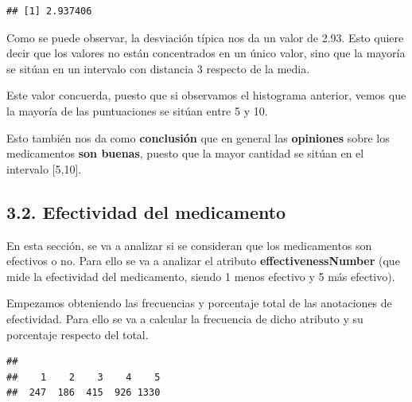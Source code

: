 \documentclass[spanish,]{article}
\newenvironment{Shaded}{\begin{snugshade}}{\end{snugshade}}
\newcommand{\KeywordTok}[1]{\textcolor[rgb]{0.13,0.29,0.53}{\textbf{#1}}}
\newcommand{\DecValTok}[1]{\textcolor[rgb]{0.00,0.00,0.81}{#1}}
\newcommand{\StringTok}[1]{\textcolor[rgb]{0.31,0.60,0.02}{#1}}
\newcommand{\CommentTok}[1]{\textcolor[rgb]{0.56,0.35,0.01}{\textit{#1}}}
\newcommand{\OperatorTok}[1]{\textcolor[rgb]{0.81,0.36,0.00}{\textbf{#1}}}
\newcommand{\NormalTok}[1]{#1}
\begin{document}
\begin{verbatim}
## [1] 2.937406
\end{verbatim}

Como se puede observar, la desviación típica nos da un valor de 2.93.
Esto quiere decir que los valores no están concentrados en un único
valor, sino que la mayoría se sitúan en un intervalo con distancia 3
respecto de la media.

Este valor concuerda, puesto que si observamos el histograma anterior,
vemos que la mayoría de las puntuaciones se sitúan entre 5 y 10.

Esto también nos da como \textbf{conclusión} que en general las
\textbf{opiniones} sobre los medicamentos \textbf{son buenas}, puesto
que la mayor cantidad se sitúan en el intervalo {[}5,10{]}.

\subsection{3.2. Efectividad del
medicamento}\label{efectividad-del-medicamento}

En esta sección, se va a analizar si se consideran que los medicamentos
son efectivos o no. Para ello se va a analizar el atributo
\textbf{effectivenessNumber} (que mide la efectividad del medicamento,
siendo 1 menos efectivo y 5 más efectivo).

Empezamos obteniendo las frecuencias y porcentaje total de las
anotaciones de efectividad. Para ello se va a calcular la frecuencia de
dicho atributo y su porcentaje respecto del total.

\begin{Shaded}
\end{Shaded}

\begin{verbatim}
## 
##    1    2    3    4    5 
##  247  186  415  926 1330
\end{verbatim}

\begin{Shaded}
\end{Shaded}
\end{document}
